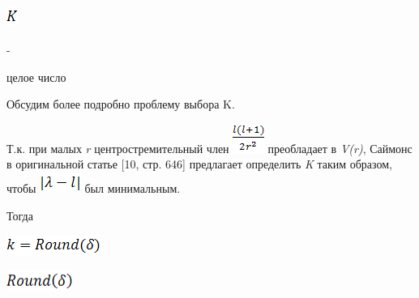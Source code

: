 \documentclass{article}
\begin{document}
\vspace{28pt}
\includegraphics[width=11pt, height=19pt, keepaspectratio=true]{3-fig036.png}

 - 

\vspace{10pt}
{\large{}целое число}

\vspace{10pt}
{\large{}Обсудим более подробно проблему выбора 
K.}

\vspace{10pt}
{\large{}Т.к. при малых }{\large{}\textit{r}}{\large{} центростремительный 
член }
\includegraphics[width=29pt, height=27pt, keepaspectratio=true]{3-fig037.png}
{\large{} преобладает в }{\large{}\textit{V(r)}}{\large{}, Саймонс 
в оригинальной статье [10, стр. 646] предлагает 
определить }{\large{}\textit{K}}{\large{} таким образом, 
чтобы }
\includegraphics[width=38pt, height=19pt, keepaspectratio=true]{3-fig038.png}
{\large{} был минимальным.}

\vspace{10pt}
{\large{}Тогда }

\vspace{10pt}
\includegraphics[width=87pt, height=19pt, keepaspectratio=true]{3-fig039.png}

\vspace{28pt}
\includegraphics[width=61pt, height=19pt, keepaspectratio=true]{3-fig040.png}
\end{document}
